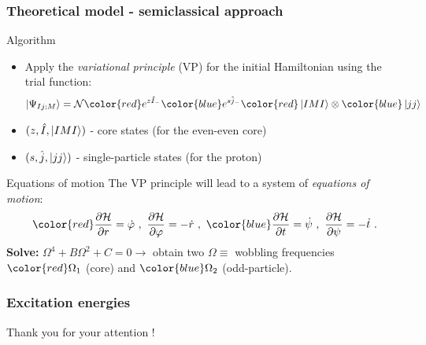 \documentclass[
	11pt, %
]{beamer}
\begin{document}
\begin{frame}
	\frametitle{Theoretical model - semiclassical approach}
	\vspace{-0.5cm}
	\begin{block}{Algorithm}
		\begin{itemize}
			\item Apply the \emph{variational principle} (VP) for the initial Hamiltonian using the trial function:
			\vspace{-0.5cm}
			\begin{align}
				\ket{\Psi_{Ij;M}}=\mathcal{N}{\color{red}e^{z\hat{I}_-}}{\color{blue}e^{s\hat{j}_-}}{\color{red}\ket{IMI}}\otimes{\color{blue}\ket{jj}}
			\end{align}
			\item $(z,\hat{I},\ket{IMI})$ - core states (for the even-even core)
			\item $(s,\hat{j},\ket{jj})$ - single-particle states (for the proton)
		\end{itemize}
	\end{block}
	\vspace{-0.2cm}
	\begin{exampleblock}{Equations of motion}
		The VP principle will lead to a system of \emph{equations of motion}:
		\begin{align}
			{\color{red}\frac{\partial\mathcal{H}}{\partial r}=\dot{\varphi}\ ,\ \frac{\partial\mathcal{H}}{\partial \varphi}=-\dot{r}}\ ,\ {\color{blue}\frac{\partial\mathcal{H}}{\partial t}=\dot{\psi}\ ,\ \frac{\partial\mathcal{H}}{\partial \psi}=-\dot{t}}\ .
		\end{align}
		\textbf{Solve:} $\Omega^4+B\Omega^2+C=0 \longrightarrow$ obtain two $\Omega\equiv$ wobbling frequencies ${\color{red}\Omega_1}$ (core) and ${\color{blue}\Omega_2}$ (odd-particle).
	\end{exampleblock}
\end{frame}

\begin{frame}
	\frametitle{Excitation energies}

	

\end{frame}


\begin{frame}[plain] %
	\begin{center}
		\bigskip\bigskip %
		{\Huge Thank you for your attention !}
	\end{center}
\end{frame}

\end{document}
